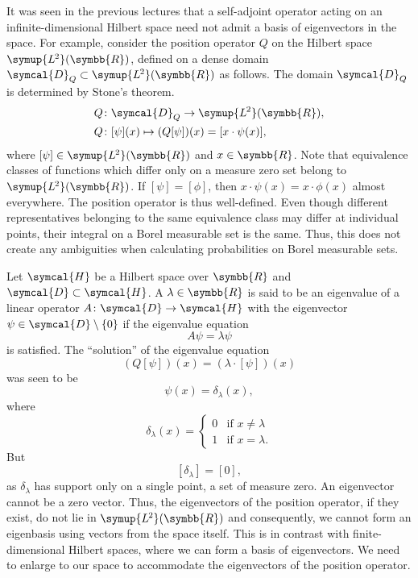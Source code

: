 \documentclass[12pt, a4 paper]{article}
\theoremstyle{definition}
\newcommand{\ltwo}{\symup{L\kern-0.5pt^2}}
\newcommand{\position}{Q}
\newcommand{\rr}{\symbb{R}}
\newcommand{\dirac}{\delta}
\newcommand{\hilbert}{\symcal{H}}
\newcommand{\ltwor}{\ltwo(\rr)}
\newcommand{\domain}{\symcal{D}}
\begin{document}
    It was seen in the previous lectures that a self-adjoint operator acting on an infinite-dimensional Hilbert space need not admit a basis of eigenvectors in the space. For example, consider the position operator $\position$ on the Hilbert space \(\ltwor\), defined on a dense domain \(\domain_{\position} \subset \ltwor\) as follows. The domain $\domain_{\position}$ is determined by Stone's  theorem.
    \begin{align*}
        \position &\colon \domain_\position \rightarrow \ltwor,\\
        \position &\colon [\psi](x) \mapsto (\position[\psi])(x) = [x \cdot \psi(x)],
    \end{align*}
    where \([\psi] \in \ltwor\) and \(x \in \rr\). Note that equivalence classes of functions which differ only on a measure zero set belong to \(\ltwor\). If $[\psi] = [\phi]$, then $x \cdot \psi(x) = x \cdot \phi(x)$ almost everywhere. The position operator is thus well-defined. Even though different representatives belonging to the same equivalence class may differ at individual points, their integral on a Borel measurable set is the same. Thus, this does not create any ambiguities when calculating probabilities on Borel measurable sets.

    Let $\hilbert$ be a Hilbert space over $\rr$ and $\domain \subset \hilbert$. A $\lambda \in \rr$ is said to be an eigenvalue of a linear operator $A \colon \domain \rightarrow \hilbert$ with the eigenvector $\psi \in \domain\setminus\{0\}$ if the eigenvalue equation
    \[A\psi = \lambda \psi\]
    is satisfied.
    The ``solution'' of the eigenvalue equation
    \[(\position[\psi])(x) = (\lambda\cdot[\psi])(x)\]
    was seen to be
    \[\psi(x) = \dirac_\lambda(x),\]
    where
    \[\dirac_\lambda(x) =
    \begin{cases}
        0 & \text{if $x \neq \lambda$}\\
        1 & \text{if $x = \lambda$}.
    \end{cases}
    \]
    But \[[\dirac_\lambda] = [0],\] as $\dirac_\lambda$ has support only on a single point, a set of measure zero. An eigenvector cannot be a zero vector. Thus, the eigenvectors of the position operator, if they exist, do not lie in $\ltwor$ and consequently, we cannot form an eigenbasis using vectors from the space itself. This is in contrast with finite-dimensional Hilbert spaces, where we can form a basis of eigenvectors. We need to enlarge to our space to accommodate the eigenvectors of the position operator.
\end{document}
